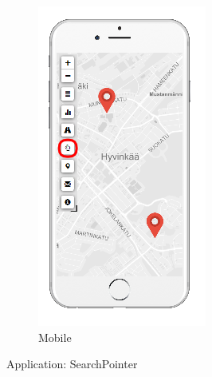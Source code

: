 \begin{figure}[ht]
\begin{subfigure}[b]{0.2\textwidth}
        \includegraphics[width=\textwidth]
          {img/c02-application/png/mobile-basemap-search.png}
        \caption{Mobile}
    \end{subfigure}
    \caption{Application: SearchPointer}
\end{figure}


